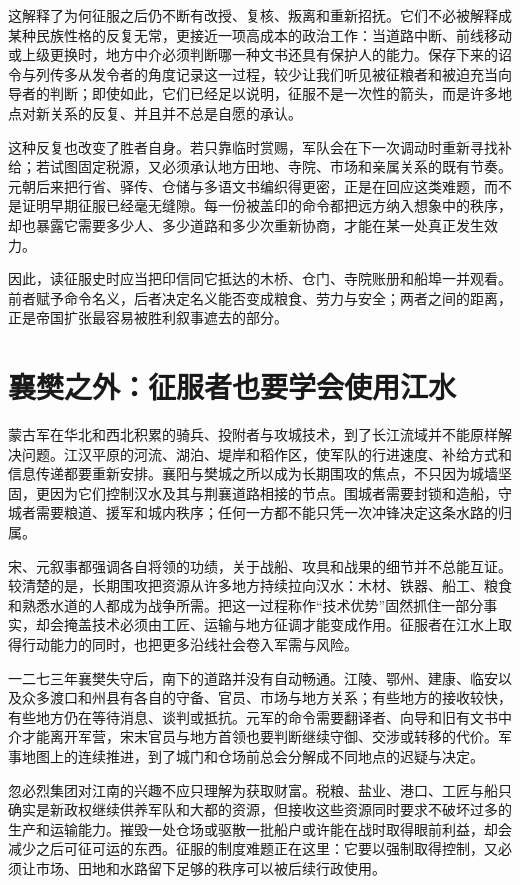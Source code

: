 这解释了为何征服之后仍不断有改授、复核、叛离和重新招抚。它们不必被解释成某种民族性格的反复无常，更接近一项高成本的政治工作：当道路中断、前线移动或上级更换时，地方中介必须判断哪一种文书还具有保护人的能力。保存下来的诏令与列传多从发令者的角度记录这一过程，较少让我们听见被征粮者和被迫充当向导者的判断；即使如此，它们已经足以说明，征服不是一次性的箭头，而是许多地点对新关系的反复、并且并不总是自愿的承认。

这种反复也改变了胜者自身。若只靠临时赏赐，军队会在下一次调动时重新寻找补给；若试图固定税源，又必须承认地方田地、寺院、市场和亲属关系的既有节奏。元朝后来把行省、驿传、仓储与多语文书编织得更密，正是在回应这类难题，而不是证明早期征服已经毫无缝隙。每一份被盖印的命令都把远方纳入想象中的秩序，却也暴露它需要多少人、多少道路和多少次重新协商，才能在某一处真正发生效力。

因此，读征服史时应当把印信同它抵达的木桥、仓门、寺院账册和船埠一并观看。前者赋予命令名义，后者决定名义能否变成粮食、劳力与安全；两者之间的距离，正是帝国扩张最容易被胜利叙事遮去的部分。

\section{襄樊之外：征服者也要学会使用江水}

蒙古军在华北和西北积累的骑兵、投附者与攻城技术，到了长江流域并不能原样解决问题。江汉平原的河流、湖泊、堤岸和稻作区，使军队的行进速度、补给方式和信息传递都要重新安排。襄阳与樊城之所以成为长期围攻的焦点，不只因为城墙坚固，更因为它们控制汉水及其与荆襄道路相接的节点。围城者需要封锁和造船，守城者需要粮道、援军和城内秩序；任何一方都不能只凭一次冲锋决定这条水路的归属。

宋、元叙事都强调各自将领的功绩，关于战船、攻具和战果的细节并不总能互证。较清楚的是，长期围攻把资源从许多地方持续拉向汉水：木材、铁器、船工、粮食和熟悉水道的人都成为战争所需。把这一过程称作“技术优势”固然抓住一部分事实，却会掩盖技术必须由工匠、运输与地方征调才能变成作用。征服者在江水上取得行动能力的同时，也把更多沿线社会卷入军需与风险。

一二七三年襄樊失守后，南下的道路并没有自动畅通。江陵、鄂州、建康、临安以及众多渡口和州县有各自的守备、官员、市场与地方关系；有些地方的接收较快，有些地方仍在等待消息、谈判或抵抗。元军的命令需要翻译者、向导和旧有文书中介才能离开军营，宋末官员与地方首领也要判断继续守御、交涉或转移的代价。军事地图上的连续推进，到了城门和仓场前总会分解成不同地点的迟疑与决定。

忽必烈集团对江南的兴趣不应只理解为获取财富。税粮、盐业、港口、工匠与船只确实是新政权继续供养军队和大都的资源，但接收这些资源同时要求不破坏过多的生产和运输能力。摧毁一处仓场或驱散一批船户或许能在战时取得眼前利益，却会减少之后可征可运的东西。征服的制度难题正在这里：它要以强制取得控制，又必须让市场、田地和水路留下足够的秩序可以被后续行政使用。

